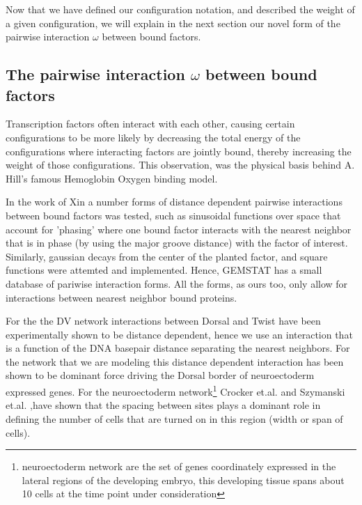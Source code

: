 Now that we have defined our configuration notation, and described the weight of a given configuration, we will explain in the next section our novel form of the pairwise interaction $\omega$ between bound factors.
%
%


\subsection{ The pairwise interaction $\omega$ between bound factors}
%
Transcription factors often interact with each other, causing certain configurations to be more likely by decreasing the total energy of the configurations where interacting factors are jointly bound, thereby increasing the weight of those configurations.  This observation, was the physical basis behind A. Hill's famous Hemoglobin Oxygen binding model.  

In the work of Xin a number forms of distance dependent pairwise interactions between bound factors was tested, such as sinusoidal functions over space that account for 'phasing' where one bound factor interacts with the nearest neighbor that is in phase (by using the major groove distance) with the factor of interest.  Similarly, gaussian decays from the center of the planted factor, and square functions were attemted and implemented.  Hence, GEMSTAT has a small database of pariwise interaction forms.  All the forms, as ours too, only allow for interactions between nearest neighbor bound proteins. 

For the the DV network interactions between Dorsal and Twist have been experimentally shown to be distance dependent, hence we use an interaction that is a function of the DNA basepair distance separating the nearest neighbors.  For the network that we are modeling this distance dependent interaction has been shown to be dominant force driving the Dorsal border of neuroectoderm expressed genes.  For the neuroectoderm network\footnote[2]{neuroectoderm network are the set of genes coordinately expressed in the lateral regions of the developing embryo, this developing tissue spans about 10 cells at the time point under consideration}  Crocker et.al. and Szymanski et.al. \cite{pmid7774581},\cite{pmid18986212}have shown that the spacing between sites plays a dominant role in defining the number of cells that are turned on in this region (width or span of cells).

